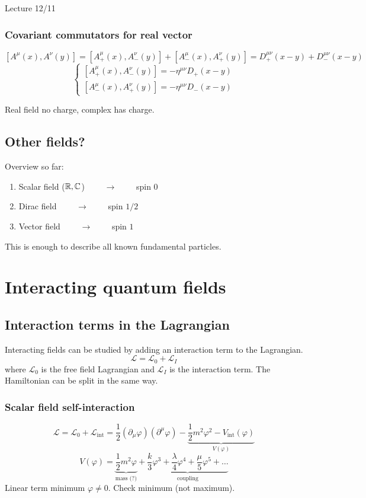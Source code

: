 Lecture 12/11

\subsection{Covariant commutators for real vector}
\[ [A^\mu(x), A^\nu(y)] = [A_+^\mu(x), A_-^\nu(y)] + [A_-^\mu(x), A_+^\nu(y)] = D^{\mu\nu}_+(x-y) + D^{\mu\nu}_-(x-y)\]
\[ \begin{cases}
\left[A^\mu_+(x), A^\nu_-(y)\right] = -\eta^{\mu\nu}D_+(x-y) \\
\left[A^\mu_-(x), A^\nu_+(y)\right] = -\eta^{\mu\nu}D_-(x-y)
\end{cases} \]


Real field no charge, complex has charge.

\section{Other fields?}
Overview so far:
\begin{enumerate}
\item Scalar field ($\mathbb{R},\mathbb{C}$) $\qquad \to \qquad$ spin $0$
\item Dirac field $\qquad \to \qquad$ spin $1/2$
\item Vector field $\qquad \to \qquad$ spin $1$
\end{enumerate}
This is enough to describe all known fundamental particles.

\chapter{Interacting quantum fields}
\section{Interaction terms in the Lagrangian}
Interacting fields can be studied by adding an interaction term to the Lagrangian.
\[ \mathcal{L}   = \mathcal{L} _0 + \mathcal{L} _I \]
where $\mathcal{L} _0$ is the free field Lagrangian and $\mathcal{L} _I$ is the interaction term. The Hamiltonian can be split in the same way.

\subsection{Scalar field self-interaction}
\[ \mathcal{L} = \mathcal{L} _0 + \mathcal{L} _\text{int} = \frac{1}{2}\left(\partial_\mu\varphi\right)\left(\partial^\mu\varphi\right)- \underbrace{\frac{1}{2}m^2\varphi^2 - V_\text{int}(\varphi)}_{V(\varphi)} \]
\[ V(\varphi) = \underbrace{\frac{1}{2}m^2\varphi}_{\text{mass (?)}} + \underbrace{\frac{k}{3}\varphi^3 + \frac{\lambda}{4}\varphi^4 + \frac{\mu}{5}\varphi^5 + \ldots}_{\text{coupling}} \]
Linear term minimum $\varphi \neq 0$. Check minimum (not maximum).

